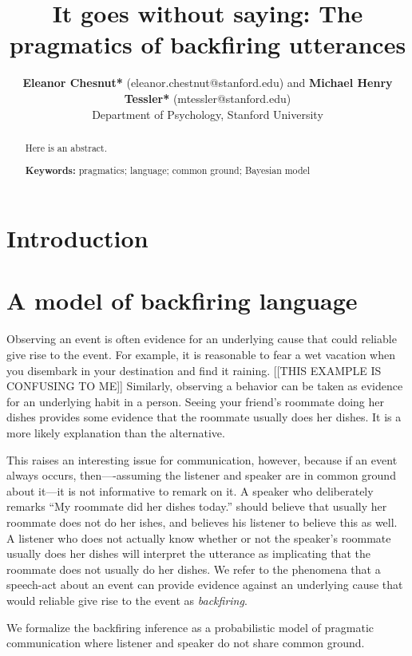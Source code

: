\documentclass[10pt,letterpaper]{article}
\title{It goes without saying: The pragmatics of backfiring utterances}
\author{{\large \bf Eleanor Chesnut*} (eleanor.chestnut@stanford.edu) and {\large \bf Michael Henry Tessler*} (mtessler@stanford.edu) \\
  Department of Psychology, Stanford University}
\begin{document}
\maketitle


\begin{abstract}
Here is an abstract.

\textbf{Keywords:} 
pragmatics; language; common ground; Bayesian model

\end{abstract}

\section{Introduction}

\section{A model of backfiring language}

Observing an event is often evidence for an underlying cause that could reliable give rise to the event.
For example, it is reasonable to fear a wet vacation when you disembark in your destination and find it raining.  [[THIS EXAMPLE IS CONFUSING TO ME]]
Similarly, observing a behavior can be taken as evidence for an underlying habit in a person. 
Seeing your friend's roommate doing her dishes provides some evidence that the roommate usually does her dishes. 
It is a more likely explanation than the alternative.

This raises an interesting issue for communication, however, because if an event always occurs, then----assuming the listener and speaker are in common ground about it---it is not informative to remark on it. 
A speaker who deliberately remarks ``My roommate did her dishes today.'' should believe that usually her roommate does not do her ishes, and believes his listener to believe this as well. 
A listener who does not actually know whether or not the speaker's roommate usually does her dishes will interpret the utterance as implicating that the roommate does not usually do her dishes.
We refer to the phenomena that a speech-act about an event can provide evidence against an underlying cause that would reliable give rise to the event as \emph{backfiring}. 

We formalize the backfiring inference as a probabilistic model of pragmatic communication where listener and speaker do not share common ground. 
\end{document}
